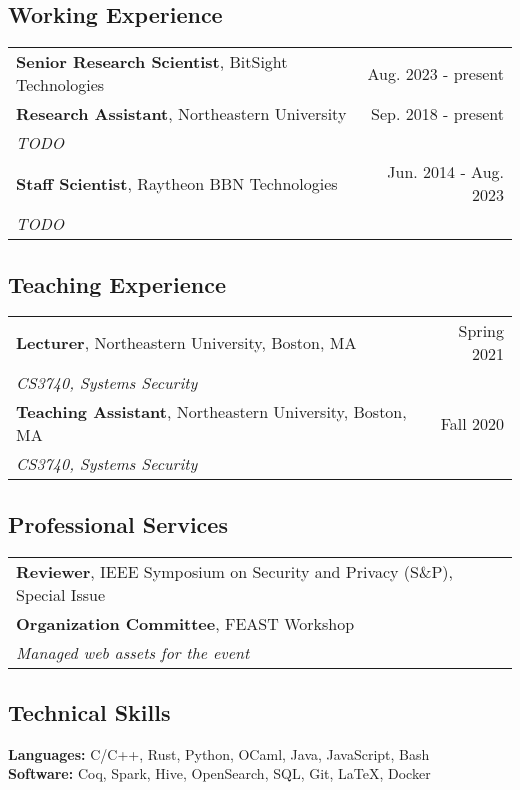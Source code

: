 \documentclass[11pt]{article}
\begin{document}
\subsection{Working Experience}
\label{sec:working-experience}

\begin{tabularx}{\textwidth}{>{\raggedright\arraybackslash}p{8cm}>{\raggedright\arraybackslash}r}
    \textbf{Senior Research Scientist}, BitSight Technologies & Aug. 2023 - present \\
    \textbf{Research Assistant}, Northeastern University & Sep. 2018 - present \\
    \textit{TODO} & \\
    \textbf{Staff Scientist}, Raytheon BBN Technologies & Jun. 2014 - Aug. 2023 \\
    \textit{TODO} & \\
\end{tabularx}

\subsection{Teaching Experience}
\label{sec:teaching-experience}

\begin{tabularx}{\textwidth}{>{\raggedright\arraybackslash}p{8cm}>{\raggedright\arraybackslash}r}
    \textbf{Lecturer}, Northeastern University, Boston, MA & Spring 2021 \\
    \textit{CS3740, Systems Security} & \\
    \textbf{Teaching Assistant}, Northeastern University, Boston, MA & Fall 2020 \\
    \textit{CS3740, Systems Security} & \\
\end{tabularx}

\subsection{Professional Services}
\label{sec:services}

\begin{tabularx}{\textwidth}{>{\raggedright\arraybackslash}p{8cm}>{\raggedright\arraybackslash}r}
    \textbf{Reviewer}, IEEE Symposium on Security and Privacy (S\&P), Special Issue & 2022 \\
    \textbf{Organization Committee}, FEAST Workshop & 2020 \\
    \textit{Managed web assets for the event} & \\
\end{tabularx}

\subsection{Technical Skills}
\label{sec:skills}

\textbf{Languages:} C/C++, Rust, Python, OCaml, Java, JavaScript, Bash \\

\textbf{Software:} Coq, Spark, Hive, OpenSearch, SQL, Git, LaTeX, Docker \\
\end{document}
